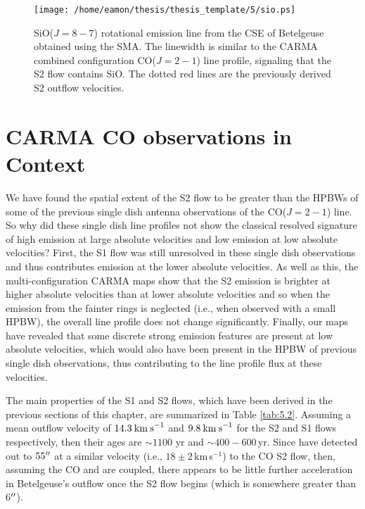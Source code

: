 \begin{figure}[!t]
\centering 
\texttt{[image: /home/eamon/thesis/thesis\_template/5/sio.ps]}
\caption[SiO rotational emission line from the CSE of Betelgeuse]{SiO($J=8-7$) rotational emission line from the CSE of Betelgeuse obtained using the SMA. The linewidth is similar to the CARMA combined configuration CO($J=2-1$) line profile, signaling that the S2 flow contains SiO. The dotted red lines are the previously derived S2 outflow velocities.}
\label{fig:5.12b}
\end{figure}

\section{CARMA CO observations in Context}\label{sec:5.11}
We have found the spatial extent of the S2 flow to be greater than the HPBWs of some of the previous single dish antenna observations of the CO($J=2-1$) line. So why did these single dish line profiles not show the classical resolved signature of high emission at large absolute velocities and low emission at low absolute velocities? First, the S1 flow was still unresolved in these single dish observations and thus contributes emission at the lower absolute velocities. As well as this, the multi-configuration CARMA maps show that the S2 emission is brighter at higher absolute velocities than at lower absolute velocities and so when the emission from the fainter rings is neglected (i.e., when observed with a small HPBW), the overall line profile does not change significantly. Finally, our maps have revealed that some discrete strong emission features are present at low absolute velocities, which would also have been present in the HPBW of previous single dish observations, thus contributing to the line profile flux at these velocities.

The main properties of the S1 and S2 flows, which have been derived in the previous sections of this chapter, are summarized in Table \ref{tab:5.2}. Assuming a mean outflow velocity of $14.3\>{\rm km\>s}^{-1}$ and $9.8\>{\rm km\>s}^{-1}$ for the S2 and S1 flows respectively, then their ages are $\sim 1100$ yr and $\sim 400 - 600$\,yr. Since \cite{plez_2002} have detected  out to $55^{\prime\prime}$ at a similar velocity (i.e., $18 \pm 2$\,km\,s$^{-1}$) to the CO S2 flow, then, assuming the CO and  are coupled, there appears to be little further acceleration in Betelgeuse's outflow once the S2 flow begins (which is somewhere greater than 6$^{\prime\prime}$). 

